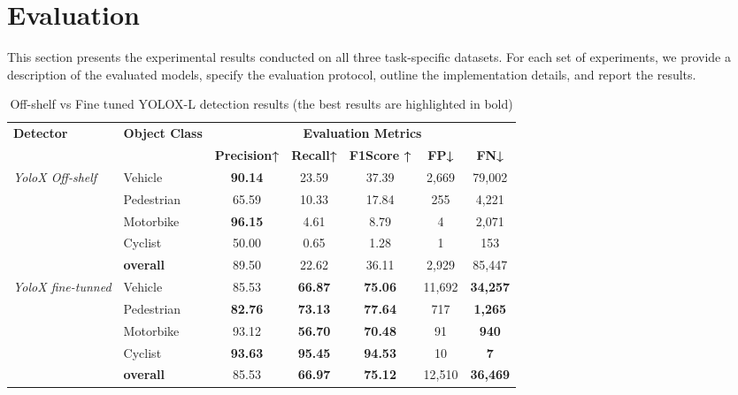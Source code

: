 \section{Evaluation}
\label{sec:eval_protocol}

This section presents the experimental results conducted on all three task-specific datasets. For each set of experiments, we provide a description of the evaluated models, specify the evaluation protocol, outline the implementation details, and report the results. 

\begin{table*}[t!]
\centering
\caption{Off-shelf vs Fine tuned YOLOX-L detection results (the best results are highlighted in bold)}
\begin{tabular}{|p{3cm}|p{2cm}|c|c|c|c|c|}
\hline
\multirow{2}{*}{\textbf{Detector}} & \multirow{2}{*}{\textbf{Object Class}} & \multicolumn{5}{c|}{\textbf{Evaluation Metrics}} \\
\cline{3-7}
& & \textbf{Precision↑} & \textbf{Recall↑} & \textbf{F1Score ↑} & \textbf{FP↓} & \textbf{FN↓} \\
\hline
\multirow{4}{3cm}{\textit{YoloX Off-shelf}} 
& Vehicle & \textbf{90.14} & 23.59 & 37.39 & 2,669 & 79,002  \\
& Pedestrian & 65.59 & 10.33 & 17.84 & 255  & 4,221 \\
& Motorbike &  \textbf{96.15} &  4.61 &  8.79 & 4 & 2,071  \\
& Cyclist & 50.00 & 0.65 & 1.28 & 1 & 153 \\
\cline{2-7}
& \textbf{overall} & 89.50 & 22.62 & 36.11 & 2,929 & 85,447 \\ 
\cline{1-7}

\multirow{4}{3cm}{\textit{YoloX fine-tunned}}
& Vehicle & 85.53 & \textbf{66.87} & \textbf{75.06} & 11,692 & \textbf{34,257} \\
& Pedestrian & \textbf{82.76} & \textbf{73.13} & \textbf{77.64} & 717 & \textbf{1,265}  \\
& Motorbike & 93.12 & \textbf{56.70} & \textbf{70.48} & 91 & \textbf{940}  \\
& Cyclist & \textbf{93.63} &  \textbf{95.45} & \textbf{94.53} & 10 & \textbf{7} \\
\cline{2-7}
& \textbf{overall} & 85.53 &\textbf{66.97} & \textbf{75.12} & 12,510 & \textbf{36,469}   \\ 
\hline 
\end{tabular}
\label{tab:detection-eval}
\end{table*}

